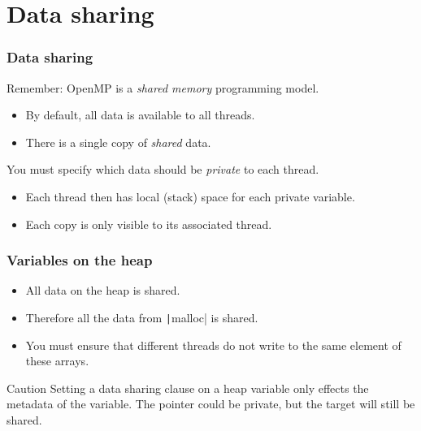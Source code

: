 \documentclass{beamer}
\begin{document}

\section{Data sharing}
\begin{frame}
\frametitle{Data sharing}
Remember: OpenMP is a \emph{shared memory} programming model.
\begin{itemize}
  \item By default, all data is available to all threads.
  \item There is a single copy of \emph{shared} data.
\end{itemize}

\vfill

You must specify which data should be \emph{private} to each thread.
\begin{itemize}
  \item Each thread then has local (stack) space for each private variable.
  \item Each copy is only visible to its associated thread.
\end{itemize}

\end{frame}


\begin{frame}
\frametitle{Variables on the heap}
\begin{itemize}
  \item All data on the heap is shared.
  \item Therefore all the data from \texttt|malloc| is shared.
  \item You must ensure that different threads do not write to the same element of these arrays.
\end{itemize}

\begin{alertblock}{Caution}
Setting a data sharing clause on a heap variable only effects the metadata of the variable.
The pointer could be private, but the target will still be shared.
\end{alertblock}
\end{frame}

\end{document}
